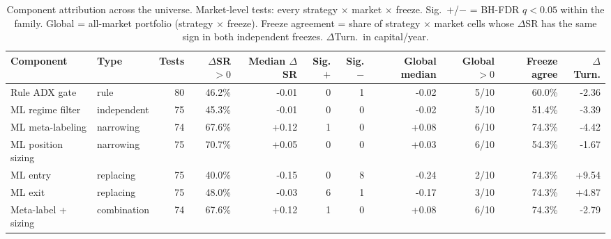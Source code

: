 \begin{table}[!t]
\centering
\caption{Component attribution across the universe. Market-level tests: every strategy $\times$ market $\times$ freeze. Sig.\ $+$/$-$ = BH-FDR $q<0.05$ within the family. Global = all-market portfolio (strategy $\times$ freeze). Freeze agreement = share of strategy $\times$ market cells whose $\Delta$SR has the same sign in both independent freezes. $\Delta$Turn.\ in capital/year.}
\label{tab:s2comp}
\footnotesize
\begin{tabular}{l l r r r r r r r r r}
\toprule
Component & Type & Tests & $\Delta$SR$>0$ & Median $\Delta$SR & Sig.$+$ & Sig.$-$ & Global median & Global $>0$ & Freeze agree & $\Delta$Turn. \\
\midrule
Rule ADX gate & rule & 80 & 46.2\% & -0.01 & 0 & 1 & -0.02 & 5/10 & 60.0\% & -2.36 \\
ML regime filter & independent & 75 & 45.3\% & -0.01 & 0 & 0 & -0.02 & 5/10 & 51.4\% & -3.39 \\
ML meta-labeling & narrowing & 74 & 67.6\% & +0.12 & 1 & 0 & +0.08 & 6/10 & 74.3\% & -4.42 \\
ML position sizing & narrowing & 75 & 70.7\% & +0.05 & 0 & 0 & +0.03 & 6/10 & 54.3\% & -1.67 \\
ML entry & replacing & 75 & 40.0\% & -0.15 & 0 & 8 & -0.24 & 2/10 & 74.3\% & +9.54 \\
ML exit & replacing & 75 & 48.0\% & -0.03 & 6 & 1 & -0.17 & 3/10 & 74.3\% & +4.87 \\
Meta-label + sizing & combination & 74 & 67.6\% & +0.12 & 1 & 0 & +0.08 & 6/10 & 74.3\% & -2.79 \\
\bottomrule
\end{tabular}
\end{table}
